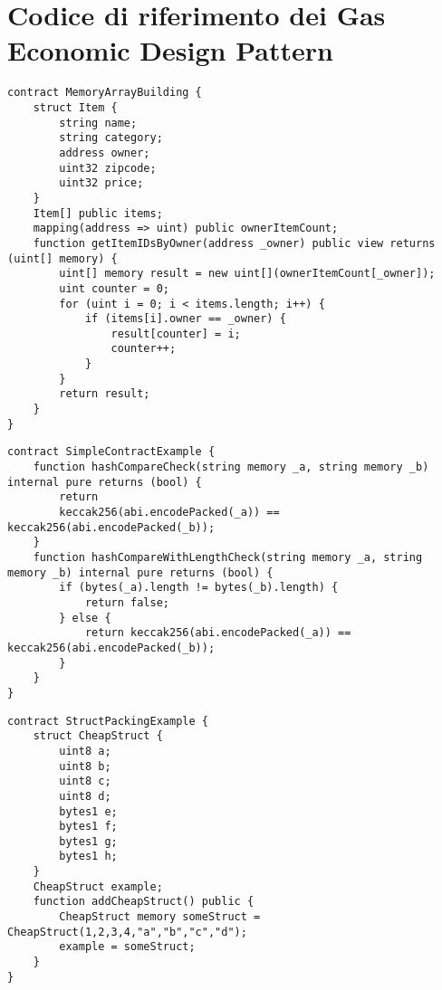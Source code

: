 {\section{Codice di riferimento dei Gas Economic Design Pattern}

{\begin{lstlisting}[language=Solidity, caption={Codice di riferimento per Memory Array Building}, label={appendix:memory_array_building}]
contract MemoryArrayBuilding {
	struct Item {
		string name;
		string category;
		address owner;
		uint32 zipcode;
		uint32 price;
	}
	Item[] public items;
	mapping(address => uint) public ownerItemCount;
	function getItemIDsByOwner(address _owner) public view returns (uint[] memory) {
		uint[] memory result = new uint[](ownerItemCount[_owner]);
		uint counter = 0;
		for (uint i = 0; i < items.length; i++) {
			if (items[i].owner == _owner) {
				result[counter] = i;
				counter++;
			}
		}
		return result;
	}
}
\end{lstlisting}}

{\begin{lstlisting}[language=Solidity, caption={Codice di riferimento per String Equality Comparison}, label={appendix:string_equality_comparison}]
contract SimpleContractExample {
	function hashCompareCheck(string memory _a, string memory _b) internal pure returns (bool) {
		return
		keccak256(abi.encodePacked(_a)) == keccak256(abi.encodePacked(_b));
	}
	function hashCompareWithLengthCheck(string memory _a, string memory _b) internal pure returns (bool) {
		if (bytes(_a).length != bytes(_b).length) {
			return false;
		} else {
			return keccak256(abi.encodePacked(_a)) == keccak256(abi.encodePacked(_b));
		}
	}
}
\end{lstlisting}}
\newpage
{\begin{lstlisting}[language=Solidity, caption={Codice di riferimento per Tight Variable Packing}, label={appendix:tight_variable_packing}]
contract StructPackingExample {
	struct CheapStruct {
		uint8 a;
		uint8 b;
		uint8 c;
		uint8 d;
		bytes1 e;
		bytes1 f;
		bytes1 g;
		bytes1 h;
	}
	CheapStruct example;
	function addCheapStruct() public {
		CheapStruct memory someStruct = CheapStruct(1,2,3,4,"a","b","c","d");
		example = someStruct;
	}
}
\end{lstlisting}}}
